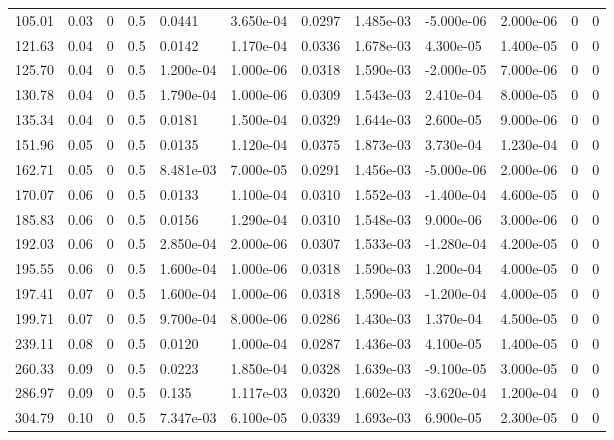 \documentclass[preview]{standalone}
\begin{document}
{{\begin{tabular}{L{1.2cm}C{1.2cm} C{0.3cm}C{0.5cm} C{1.4cm}C{1.4cm} C{1.4cm}C{1.4cm} C{1.6cm}C{1.6cm} C{1.6cm}C{1.6cm}}
  105.01  &  0.03  & 0     & 0.5 &  0.0441  & 3.650e-04  &  0.0297&   1.485e-03& -5.000e-06 & 2.000e-06   &  0 & 0  \\ 
  121.63  &  0.04  & 0     & 0.5 &  0.0142  & 1.170e-04  &  0.0336&   1.678e-03& 4.300e-05 & 1.400e-05   &  0 & 0  \\ 
  125.70  &  0.04  & 0     & 0.5 &  1.200e-04  & 1.000e-06  &  0.0318&   1.590e-03& -2.000e-05 & 7.000e-06   &  0 & 0  \\ 
  130.78  &  0.04  & 0     & 0.5 &  1.790e-04  & 1.000e-06  &  0.0309&   1.543e-03& 2.410e-04 & 8.000e-05   &  0 & 0  \\ 
  135.34  &  0.04  & 0     & 0.5 &  0.0181  & 1.500e-04  &  0.0329&   1.644e-03& 2.600e-05 & 9.000e-06   &  0 & 0  \\ 
  151.96  &  0.05  & 0     & 0.5 &  0.0135  & 1.120e-04  &  0.0375&   1.873e-03& 3.730e-04 & 1.230e-04   &  0 & 0  \\ 
  162.71  &  0.05  & 0     & 0.5 &  8.481e-03  & 7.000e-05  &  0.0291&   1.456e-03& -5.000e-06 & 2.000e-06   &  0 & 0  \\ 
  170.07  &  0.06  & 0     & 0.5 &  0.0133  & 1.100e-04  &  0.0310&   1.552e-03& -1.400e-04 & 4.600e-05   &  0 & 0  \\ 
  185.83  &  0.06  & 0     & 0.5 &  0.0156  & 1.290e-04  &  0.0310&   1.548e-03& 9.000e-06 & 3.000e-06   &  0 & 0  \\ 
  192.03  &  0.06  & 0     & 0.5 &  2.850e-04  & 2.000e-06  &  0.0307&   1.533e-03& -1.280e-04 & 4.200e-05   &  0 & 0  \\ 
  195.55  &  0.06  & 0     & 0.5 &  1.600e-04  & 1.000e-06  &  0.0318&   1.590e-03& 1.200e-04 & 4.000e-05   &  0 & 0  \\ 
  197.41  &  0.07  & 0     & 0.5 &  1.600e-04  & 1.000e-06  &  0.0318&   1.590e-03& -1.200e-04 & 4.000e-05   &  0 & 0  \\ 
  199.71  &  0.07  & 0     & 0.5 &  9.700e-04  & 8.000e-06  &  0.0286&   1.430e-03& 1.370e-04 & 4.500e-05   &  0 & 0  \\ 
  239.11  &  0.08  & 0     & 0.5 &  0.0120  & 1.000e-04  &  0.0287&   1.436e-03& 4.100e-05 & 1.400e-05   &  0 & 0  \\ 
  260.33  &  0.09  & 0     & 0.5 &  0.0223  & 1.850e-04  &  0.0328&   1.639e-03& -9.100e-05 & 3.000e-05   &  0 & 0  \\ 
  286.97  &  0.09  & 0     & 0.5 &  0.135  & 1.117e-03  &  0.0320&   1.602e-03& -3.620e-04 & 1.200e-04   &  0 & 0  \\ 
  304.79  &  0.10  & 0     & 0.5 &  7.347e-03  & 6.100e-05  &  0.0339&   1.693e-03& 6.900e-05 & 2.300e-05   &  0 & 0  \\ 

\end{tabular}}}
\end{document}
